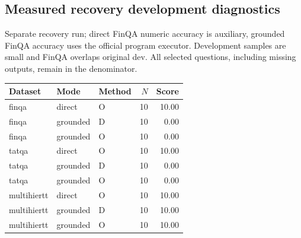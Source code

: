 \subsection{Measured recovery development diagnostics}
Separate recovery run; direct FinQA numeric accuracy is auxiliary, grounded FinQA accuracy uses the official program executor. Development samples are small and FinQA overlaps original dev. All selected questions, including missing outputs, remain in the denominator.
\begin{center}\small\begin{tabular}{lllrr}
Dataset & Mode & Method & $N$ & Score\\\hline
finqa & direct & O & 10 & 10.00\\
finqa & grounded & D & 10 & 0.00\\
finqa & grounded & O & 10 & 0.00\\
tatqa & direct & O & 10 & 10.00\\
tatqa & grounded & D & 10 & 0.00\\
tatqa & grounded & O & 10 & 0.00\\
multihiertt & direct & O & 10 & 10.00\\
multihiertt & grounded & D & 10 & 10.00\\
multihiertt & grounded & O & 10 & 10.00\\
\end{tabular}\end{center}
